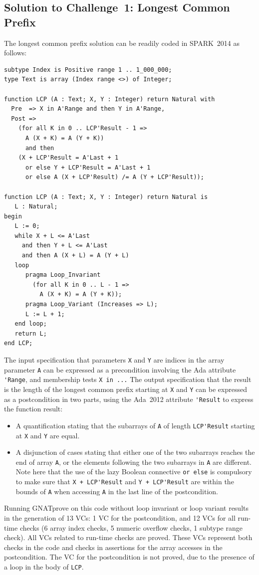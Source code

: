 \documentclass[sttt,final]{svjour}
\newcommand{\gnatprove}{GNATprove\xspace}
\newcommand{\newspark}{SPARK~2014\xspace}
\newcommand{\adatwtw}{Ada~2012\xspace}
\begin{document}
\subsection{Solution to Challenge~1: Longest Common Prefix}
The longest common prefix solution can be readily coded in \newspark
as follows:
%
\begin{lstlisting}
subtype Index is Positive range 1 .. 1_000_000;
type Text is array (Index range <>) of Integer;

function LCP (A : Text; X, Y : Integer) return Natural with
  Pre  => X in A'Range and then Y in A'Range,
  Post =>
    (for all K in 0 .. LCP'Result - 1 =>
      A (X + K) = A (Y + K))
      and then
    (X + LCP'Result = A'Last + 1
      or else Y + LCP'Result = A'Last + 1
      or else A (X + LCP'Result) /= A (Y + LCP'Result));

function LCP (A : Text; X, Y : Integer) return Natural is
   L : Natural;
begin
   L := 0;
   while X + L <= A'Last
     and then Y + L <= A'Last
     and then A (X + L) = A (Y + L)
   loop
      pragma Loop_Invariant
        (for all K in 0 .. L - 1 =>
          A (X + K) = A (Y + K));
      pragma Loop_Variant (Increases => L);
      L := L + 1;
   end loop;
   return L;
end LCP;
\end{lstlisting}
%
The input
specification that parameters \verb|X| and \verb|Y| are indices in the array
parameter \verb|A| can be expressed as a precondition involving the Ada
attribute \verb|'Range|, and membership tests \verb|X in ...| The output
specification that the result is the length of the longest common prefix
starting at \verb|X| and \verb|Y| can be expressed as a postcondition in two
parts, using the \adatwtw attribute \verb|'Result| to express the function
result:
\begin{itemize}
\item A quantification stating that the subarrays of \verb|A| of length
  \verb|LCP'Result| starting at \verb|X| and \verb|Y| are equal.
\item A disjunction of cases stating that either one of the two
  subarrays reaches the end of array \verb|A|, or the elements
  following the two subarrays in \verb|A| are different. Note here
  that the use of the lazy Boolean connective \verb|or else| is
  compulsory to make sure that \verb|X + LCP'Result| and
  \verb|Y + LCP'Result| are within the bounds of \verb|A| when
  accessing \verb|A| in the last line of the postcondition.
\end{itemize}

Running \gnatprove on this code without loop invariant or loop variant results
in the generation of 13 VCs: 1 VC for the postcondition, and 12 VCs for all
run-time checks (6 array index checks, 5 numeric overflow checks, 1 subtype
range check). All VCs related to run-time checks are proved. These VCs
represent both checks in the code and checks in assertions for the array
accesses in the postcondition. The VC for the postcondition is not proved, due
to the presence of a loop in the body of \verb|LCP|.
\end{document}
